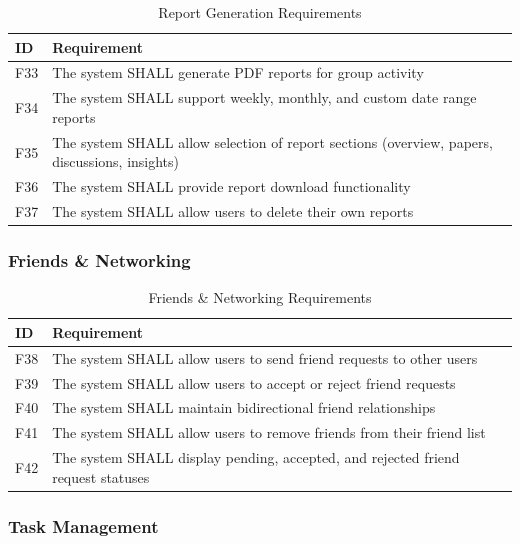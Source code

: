 \documentclass[11pt,a4paper]{article}
\begin{document}
\begin{table}[H]
\centering
\begin{tabular}{p{1.5cm}p{11.5cm}}
\toprule
\textbf{ID} & \textbf{Requirement} \\
\midrule
F33 & The system SHALL generate PDF reports for group activity \\
F34 & The system SHALL support weekly, monthly, and custom date range reports \\
F35 & The system SHALL allow selection of report sections (overview, papers, discussions, insights) \\
F36 & The system SHALL provide report download functionality \\
F37 & The system SHALL allow users to delete their own reports \\
\bottomrule
\end{tabular}
\caption{Report Generation Requirements}
\end{table}

\subsubsection{Friends \& Networking}

\begin{table}[H]
\centering
\begin{tabular}{p{1.5cm}p{11.5cm}}
\toprule
\textbf{ID} & \textbf{Requirement} \\
\midrule
F38 & The system SHALL allow users to send friend requests to other users \\
F39 & The system SHALL allow users to accept or reject friend requests \\
F40 & The system SHALL maintain bidirectional friend relationships \\
F41 & The system SHALL allow users to remove friends from their friend list \\
F42 & The system SHALL display pending, accepted, and rejected friend request statuses \\
\bottomrule
\end{tabular}
\caption{Friends \& Networking Requirements}
\end{table}

\subsubsection{Task Management}
\end{document}

